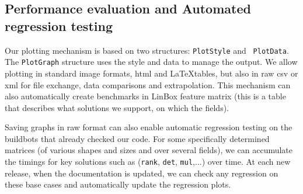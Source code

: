 \documentclass[a4paper]{article}
\def\textsf#1{{\biolinum #1}}
\def\ldots{...}
\newcommand\linbox{\textsf{LinBox}\xspace}
\begin{document}
\subsection{Performance evaluation and Automated regression testing}
%
Our plotting mechanism is based on two structures: {\tt PlotStyle} and {\tt
PlotData}. The  {\tt PlotGraph} structure uses the style and data to manage the
output.  We allow plotting in standard image formats, html and \LaTeX tables,
but also in raw csv or xml for file exchange, data comparisons and
extrapolation.
This mechanism can also automatically create benchmarks in \linbox
feature matrix (this is a table that describes what solutions we support, on
which the fields).
%
\par
%
% 
%
%
%
Saving graphs in raw format can also enable automatic regression testing on the
buildbots that already checked our code. For some specifically determined matrices (of
various shapes and sizes and over several fields), we can accumulate the timings
for key solutions such as ({\tt rank}, {\tt det}, {\tt mul},\ldots) over time.
At each new release, when the documentation is updated, we can check any
regression on these base cases and automatically update the regression plots.
%
\end{document}
